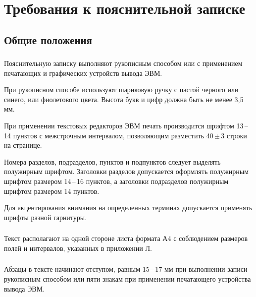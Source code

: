 





\tableofcontents
\newpage

\section{Требования к пояснительной записке}

\subsection{Общие положения}

\subsubsection{} 
Пояснительную  записку  выполняют  рукописным  способом  или  с применением печатающих и графических устройств вывода ЭВМ. 

При рукописном способе используют шариковую ручку с пастой черного или синего, или фиолетового цвета. Высота букв и цифр должна быть не менее 3,5 мм. 

При применении текстовых редакторов ЭВМ печать производится шрифтом 13\,--\,14  пунктов  с  межстрочным  интервалом,  позволяющим  разместить  
40\,\( \pm \)\,3 строки на странице. 

Номера  разделов,  подразделов,  пунктов и подпунктов следует выделять полужирным  шрифтом.  Заголовки  разделов  допускается  оформлять  полужирным шрифтом размером 14\,--\,16 пунктов, а заголовки подразделов полужирным шрифтом размером 14 пунктов. 

Для  акцентирования  внимания  на  определенных  терминах  допускается применять шрифты разной гарнитуры. 

\subsubsection{}
Текст располагают на одной стороне листа формата А4 с соблюдением размеров полей и интервалов, указанных в приложении Л.

\subsubsection{}
Абзацы в тексте начинают отступом, равным 15\,--\,17 мм при выполнении  записи  рукописным  способом  или  пяти  знакам  при  применении  печатающего устройства вывода ЭВМ.

